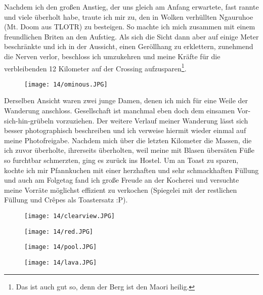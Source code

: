Nachdem ich den großen Anstieg, der uns gleich am Anfang erwartete,
fast rannte und viele überholt habe, traute ich mir zu, den in Wolken
verhüllten Ngauruhoe (Mt. Doom aus TLOTR) zu besteigen. So machte ich
mich zusammen mit einem freundlichen Briten an den Aufstieg.  Als sich
die Sicht dann aber auf einige Meter beschränkte und ich in der
Aussicht, einen Geröllhang zu erklettern, zunehmend die Nerven verlor,
beschloss ich umzukehren und meine Kräfte für die verbleibenden 12
Kilometer auf der Crossing aufzusparen\footnote{Das ist auch gut so,
denn der Berg ist den Maori heilig.}.
\begin{figure}[h]
  \centering
  \texttt{[image: 14/ominous.JPG]}
\end{figure}

Derselben Ansicht waren zwei junge Damen, denen ich mich für eine
Weile der Wanderung anschloss.  Gesellschaft ist manchmal eben doch
dem einsamen Vor-sich-hin-grübeln vorzuziehen. Der weitere Verlauf
meiner Wanderung lässt sich besser photographisch beschreiben und ich
verweise hiermit wieder einmal auf meine Photofreigabe. Nachdem mich
über die letzten Kilometer die Massen, die ich zuvor überholte,
ihrerseits überholten, weil meine mit Blasen übersäten Füße so
furchtbar schmerzten, ging es zurück ins Hostel. Um an Toast zu
sparen, kochte ich mir Pfannkuchen mit einer herzhaften und sehr
schmackhaften Füllung und auch am Folgetag fand ich große Freude an
der Kocherei und versuchte meine Vorräte möglichst effizient zu
verkochen (Spiegelei mit der restlichen Füllung und Crêpes als
Toastersatz :P).
\begin{figure}[p]
  \centering
  \texttt{[image: 14/clearview.JPG]}
\end{figure}
\begin{figure}[p]
  \centering
  \texttt{[image: 14/red.JPG]}
\end{figure}
\begin{figure}[p]
  \centering
  \texttt{[image: 14/pool.JPG]}
\end{figure}
\begin{figure}[p]
  \centering
  \texttt{[image: 14/lava.JPG]}
\end{figure}

